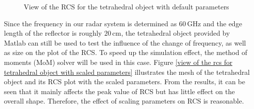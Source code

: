 \documentclass[12pt,DIV14,BCOR12mm,a4paper,footinclude=false,headinclude,parskip=half-,twoside,openright,cleardoublepage=empty,toc=index,bibliography=totoc,listof=totoc]{scrreprt}
\numberwithin{equation}{chapter}
\begin{document}
\begin{figure}[t]
\begin{subfigure}{0.45\textwidth}
    \end{subfigure}
    \caption{View of the RCS for the tetrahedral object with default parameters}
    \label{view of the rcs for tetrahedral object with default parameters}
\end{figure}

Since the frequency in our radar system is determined as $60\,\mathrm{GHz}$ and the edge length of the reflector is roughly $20\,\mathrm{cm}$, the tetrahedral object provided by Matlab can still be used to test the influence of the change of frequency, as well as size on the plot of the RCS. To speed up the simulation effect, the method of moments (MoM) solver will be used in this case. Figure \ref{view of the rcs for tetrahedral object with scaled parameters} illustrates the mesh of the tetrahedral object and its RCS plot with the scaled parameters. From the results, it can be seen that it mainly affects the peak value of RCS but has little effect on the overall shape. Therefore, the effect of scaling parameters on RCS is reasonable.
\end{document}
